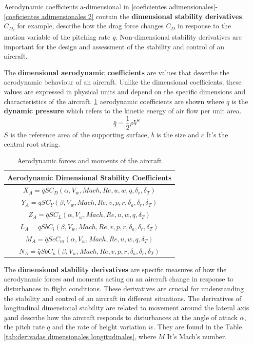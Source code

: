 Aerodynamic coefficients a-dimensional in \ref{coeficientes adimensionales}-\ref{coeficientes adimensionales 2} contain the \textbf{dimensional stability derivatives}. $ C_{D_{q}}$ for example, describe how the drag force changes $C_D$ in response to the motion variable of the pitching rate $q$. Non-dimensional stability derivatives are important for the design and assessment of the stability and control of an aircraft.

The \textbf{dimensional aerodynamic coefficients} are values that describe the aerodynamic behaviour of an aircraft. Unlike the dimensional coefficients, these values are expressed in physical units and depend on the specific dimensions and characteristics of the aircraft. \ref{Fuerzas y momentos aerodinámicos de la aeronave 2} aerodynamic coefficients are shown where $\bar{q}$ is the \textbf{dynamic pressure} which refers to the kinetic energy of air flow per unit area.
\begin{equation}
    \bar{q} = \frac{1}{2} \rho V^2
\end{equation}
$S$ is the reference area of the supporting surface, $b$ is the size and $c$ It's the central root string.
\begin{table}[!h]
    \centering
    \begin{tabular}{|c|}
    \hline
    \textbf{Aerodynamic Dimensional Stability Coefficients}\\
    \hline
    $X_{A} = \bar{q} S C_{D} (\alpha, V_w, Mach, Re, u, w, q, \delta_e, \delta_T)$ \\
    $Y_{A} = \bar{q} S C_{Y} (\beta, V_w, Mach, Re, v, p, r, \delta_a , \delta_r, \delta_T)$  \\
    $Z_{A} = \bar{q} S C_{L} (\alpha, V_w, Mach, Re, u, w, q, \delta_T)$    \\
    $L_{A} = \bar{q} S b C_{l} (\beta,V_w, Mach, Re, v, p, r, \delta_a , \delta_r, \delta_T)$ \\
    $M_{A} = \bar{q} S c C_{m} (\alpha, V_w, Mach, Re, u, w, q, \delta_T)$  \\
    $N_{A} = \bar{q} S b C_{n} (\beta, V_w, Mach, Re, v, p, r, \delta_a , \delta_r, \delta_T)$  \\
    \hline
    \end{tabular}
    \caption{Aerodynamic forces and moments of the aircraft}
    \label{Fuerzas y momentos aerodinámicos de la aeronave 2}
\end{table}


The \textbf{dimensional stability derivatives} are specific measures of how the aerodynamic forces and moments acting on an aircraft change in response to disturbances in flight conditions. These derivatives are crucial for understanding the stability and control of an aircraft in different situations. The derivatives of longitudinal dimensional stability are related to movement around the lateral axis $y$and describe how the aircraft responds to disturbances at the angle of attack $\alpha$, the pitch rate $q$ and the rate of height variation $\dot{w}$. They are found in the Table \ref{tab:derivadas dimensionales longitudinales}, where $M$ It's Mach's number. 


